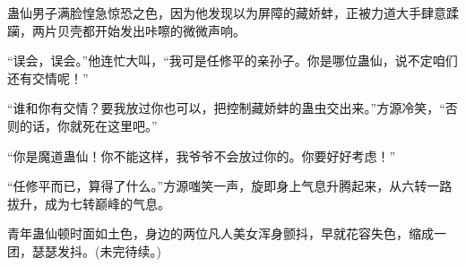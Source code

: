 \begin{this_body}
蛊仙男子满脸惶急惊恐之色，因为他发现以为屏障的藏娇蚌，正被力道大手肆意蹂躏，两片贝壳都开始发出咔嚓的微微声响。

“误会，误会。”他连忙大叫，“我可是任修平的亲孙子。你是哪位蛊仙，说不定咱们还有交情呢！”

“谁和你有交情？要我放过你也可以，把控制藏娇蚌的蛊虫交出来。”方源冷笑，“否则的话，你就死在这里吧。”

“你是魔道蛊仙！你不能这样，我爷爷不会放过你的。你要好好考虑！”

“任修平而已，算得了什么。”方源嗤笑一声，旋即身上气息升腾起来，从六转一路拔升，成为七转巅峰的气息。

青年蛊仙顿时面如土色，身边的两位凡人美女浑身颤抖，早就花容失色，缩成一团，瑟瑟发抖。(未完待续。)

\end{this_body}

